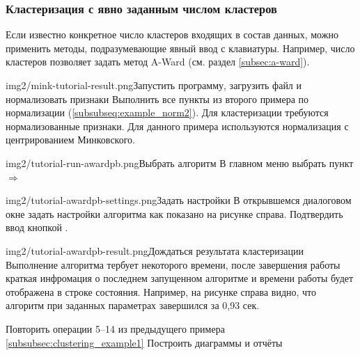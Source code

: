 \documentclass[12pt,tikz]{instruction}
\begin{document}
\newpage
\subsubsection{Кластеризация с явно заданным числом кластеров}

Если известно конкретное число кластеров входящих в состав данных, можно применить методы, подразумевающие явный ввод с клавиатуры. Например, число кластеров позволяет задать метод A-Ward (см. раздел \ref{subsec:a-ward}).

\begin{steps}
	\begin{ist}{img2/mink-tutorial-result.png}{Запустить программу, загрузить файл и нормализовать признаки}
		Выполнить все пункты из второго примера по нормализации (\ref{subsubseq:example_norm2}). Для кластеризации требуются нормализованные признаки. Для данного примера используются нормализация с центрированием Минковского.
	\end{ist}
	\begin{ist}{img2/tutorial-run-awardpb.png}{Выбрать алгоритм \AWardpb}
		В главном меню выбрать пункт  $ \Rightarrow $ \menu{\AWardpb}
	\end{ist}
	\begin{ist}{img2/tutorial-awardpb-settings.png}{Задать настройки}
		В открывшемся диалоговом окне задать настройки алгоритма как показано на рисунке справа. Подтвердить ввод кнопкой .\vspace{5cm}
	\end{ist}
	\begin{ist}{img2/tutorial-awardpb-result.png}{Дождаться результата кластеризации}
		Выполнение алгоритма тербует некоторого времени, после завершения работы краткая инфромация о последнем запущенном алгоритме и времени работы будет отображена в строке состояния. Например, на рисунке справа видно, что алгоритм \AWardpb при заданных параметрах завершился за 0,93 сек.
	\end{ist}
	\begin{istt}{Повторить операции 5--14 из предыдущего примера \ref{subsubsec:clustering_example1} }{Построить диаграммы и отчёты}
	\end{istt}
	
		
\end{steps}


{} %
\glsaddall

\printglossary[type=\acronymtype,nonumberlist,style=acrostyle]

\newpage
{}
\printglossary[nonumberlist]

\newpage
\nocite{amorim} \nocite{ward} \nocite{boley} \nocite{tasoulis} \nocite{kovaleva} \nocite{mirkin}

\end{document}
